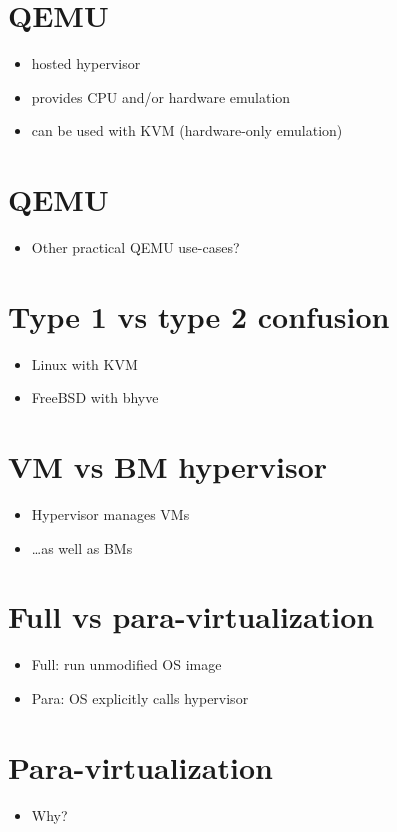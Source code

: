 \documentclass[11pt]{article}
\begin{document}
\section*{QEMU}
\label{sec:org934ab67}
\begin{itemize}
\item hosted hypervisor
\item provides CPU and/or hardware emulation
\item can be used with KVM (hardware-only emulation)
\end{itemize}

\section*{QEMU}
\label{sec:org28a1f22}
\begin{itemize}
\item Other practical QEMU use-cases?
\end{itemize}

\section*{Type 1 vs type 2 confusion}
\label{sec:org6436013}
\begin{itemize}
\item Linux with KVM
\item FreeBSD with bhyve
\end{itemize}

\section*{VM vs BM hypervisor}
\label{sec:org42e63b4}
\begin{itemize}
\item Hypervisor manages VMs
\item \ldots{}as well as BMs
\end{itemize}

\section*{Full vs para-virtualization}
\label{sec:orgb519da7}
\begin{itemize}
\item Full: run unmodified OS image
\item Para: OS explicitly calls hypervisor
\end{itemize}

\section*{Para-virtualization}
\label{sec:orgd6c2f57}
\begin{itemize}
\item Why?
\end{itemize}
\end{document}
